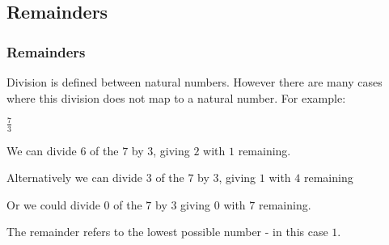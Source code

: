 
\subsection{Remainders}

\subsubsection{Remainders}

Division is defined between natural numbers. However there are many cases where this division does not map to a natural number. For example:

$\frac{7}{3}$

We can divide \(6\) of the \(7\) by \(3\), giving \(2\) with \(1\) remaining.

Alternatively we can divide \(3\) of the \(7\) by \(3\), giving \(1\) with \(4\) remaining

Or we could divide \(0\) of the \(7\) by \(3\) giving \(0\) with \(7\) remaining.

The remainder refers to the lowest possible number - in this case \(1\).

